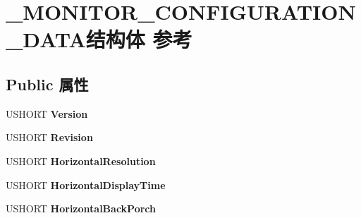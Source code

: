 \hypertarget{struct___m_o_n_i_t_o_r___c_o_n_f_i_g_u_r_a_t_i_o_n___d_a_t_a}{}\section{\+\_\+\+M\+O\+N\+I\+T\+O\+R\+\_\+\+C\+O\+N\+F\+I\+G\+U\+R\+A\+T\+I\+O\+N\+\_\+\+D\+A\+T\+A结构体 参考}
\label{struct___m_o_n_i_t_o_r___c_o_n_f_i_g_u_r_a_t_i_o_n___d_a_t_a}
\subsection*{Public 属性}
\begin{DoxyCompactItemize}
\item 
\mbox{\label{struct___m_o_n_i_t_o_r___c_o_n_f_i_g_u_r_a_t_i_o_n___d_a_t_a_a2c91ec0fd68f1201e7636eb2889c1b49}} 
U\+S\+H\+O\+RT {\bfseries Version}
\item 
\mbox{\label{struct___m_o_n_i_t_o_r___c_o_n_f_i_g_u_r_a_t_i_o_n___d_a_t_a_af096bc8c3f87a5a9b27c8264c431a412}} 
U\+S\+H\+O\+RT {\bfseries Revision}
\item 
\mbox{\label{struct___m_o_n_i_t_o_r___c_o_n_f_i_g_u_r_a_t_i_o_n___d_a_t_a_a354721d0318622b31a038fcc7e45af4a}} 
U\+S\+H\+O\+RT {\bfseries Horizontal\+Resolution}
\item 
\mbox{\label{struct___m_o_n_i_t_o_r___c_o_n_f_i_g_u_r_a_t_i_o_n___d_a_t_a_a497be9ad26635af481508b37d73c10ef}} 
U\+S\+H\+O\+RT {\bfseries Horizontal\+Display\+Time}
\item 
\mbox{\label{struct___m_o_n_i_t_o_r___c_o_n_f_i_g_u_r_a_t_i_o_n___d_a_t_a_a05444bdd8ddc2d1300760a2bd7bf49bc}} 
U\+S\+H\+O\+RT {\bfseries Horizontal\+Back\+Porch}
\item 
\mbox{\label{struct___m_o_n_i_t_o_r___c_o_n_f_i_g_u_r_a_t_i_o_n___d_a_t_a_adb5ee41d5bdeef4b2219cd4c042c2de9}} 

\end{DoxyCompactItemize}
